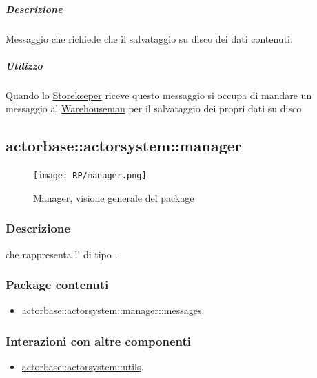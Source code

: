\documentclass{scalatekids-article}
\begin{document}
\subparagraph{Descrizione}
Messaggio che richiede che il salvataggio su disco dei dati contenuti.

\subparagraph{Utilizzo}
Quando lo \hyperref[sec:actorbase::actorsystem::storekeeper::Storekeeper]{Storekeeper}
riceve questo messaggio si occupa di mandare un messaggio al \hyperref[sec:actorbase::actorsystem::warehouseman::Warehouseman]{Warehouseman}
per il salvataggio dei propri dati su disco.



\subsection{actorbase::actorsystem::manager}
\label{sec:actorbase::actorsystem::manager}

\begin{figure}[H]
  \begin{center}
    \texttt{[image: RP/manager.png]}
    \caption{Manager, visione generale del package}
  \end{center}
\end{figure}

\subsubsection{Descrizione}
 che rappresenta l' di tipo .

\subsubsection{Package contenuti}

\begin{itemize}
\item \hyperref[sec:actorbase::actorsystem::manager::messages]{actorbase::actorsystem::manager::messages}.
\end{itemize}

\subsubsection{Interazioni con altre componenti}
\begin{itemize}
\item \hyperref[sec:actorbase::actorsystem::utils]{actorbase::actorsystem::utils}.
\end{itemize}
\end{document}
